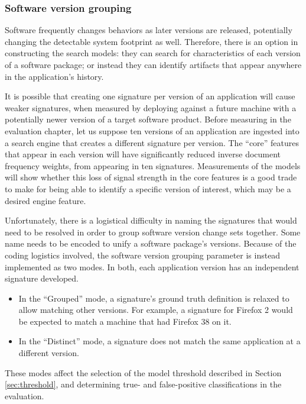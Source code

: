 \documentclass[11pt]{ucthesis}
\theoremstyle{plain}
\theoremstyle{definition}
\begin{document}
\subsubsection{Software version grouping}
\label{sec:versiongrouping}

Software frequently changes behaviors as later versions are released, potentially changing the detectable system footprint as well.  Therefore, there is an option in constructing the search models:  they can search for characteristics of each version of a software package; or instead they can identify artifacts that appear anywhere in the application's history.

It is possible that creating one signature per version of an application will cause weaker signatures, when measured by deploying against a future machine with a potentially newer version of a target software product.  Before measuring in the evaluation chapter, let us suppose ten versions of an application are ingested into a search engine that creates a different signature per version.  The ``core'' features that appear in each version will have significantly reduced inverse document frequency weights, from appearing in ten signatures.  Measurements of the models will show whether this loss of signal strength in the core features is a good trade to make for being able to identify a specific version of interest, which may be a desired engine feature.

Unfortunately, there is a logistical difficulty in naming the signatures that would need to be resolved in order to group software version change sets together.  Some name needs to be encoded to unify a software package's versions.  Because of the coding logistics involved, the software version grouping parameter is instead implemented as two modes.  In both, each application version has an independent signature developed.

\begin{itemize}
\item In the ``Grouped'' mode, a signature's ground truth definition is relaxed to allow matching other versions.  For example, a signature for Firefox 2 would be expected to match a machine that had Firefox 38 on it.
\item In the ``Distinct'' mode, a signature does not match the same application at a different version.
\end{itemize}

These modes affect the selection of the model threshold described in Section \ref{sec:threshold}, and determining true- and false-positive classifications in the evaluation.
\end{document}
